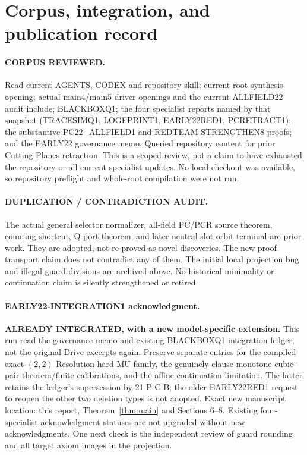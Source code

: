 \documentclass[11pt]{article}
\begin{document}
\section{Corpus, integration, and publication record}
\paragraph{CORPUS REVIEWED.}
Read current AGENTS, CODEX and repository skill; current root synthesis
opening; actual main4/main5 driver openings and the current ALLFIELD22 audit
include; BLACKBOXQ1; the four specialist reports named by that snapshot
(TRACESIMQ1, LOGFPRINT1, EARLY22RED1, PCRETRACT1); the substantive
PC22\_ALLFIELD1 and REDTEAM-STRENGTHEN8 proofs; and the EARLY22 governance
memo. Queried repository content for prior Cutting Planes retraction. This
is a scoped review, not a claim to have exhausted the repository or all
current specialist updates. No local checkout was available, so repository
preflight and whole-root compilation were not run.

\paragraph{DUPLICATION / CONTRADICTION AUDIT.}
The actual general selector normalizer, all-field PC/PCR source theorem,
counting shortcut, Q port theorem, and later neutral-slot orbit terminal are
prior work. They are adopted, not re-proved as novel discoveries. The new
proof-transport claim does not contradict any of them. The initial local
projection bug and illegal guard divisions are archived above. No historical
minimality or continuation claim is silently strengthened or retired.

\paragraph{EARLY22-INTEGRATION1 acknowledgment.}
\textbf{ALREADY INTEGRATED, with a new model-specific extension.} This run
read the governance memo and existing BLACKBOXQ1 integration ledger, not the
original Drive excerpts again. Preserve separate entries for the compiled
exact-$(2,2)$ Resolution-hard MU family, the genuinely clause-monotone
cubic-pair theorem/finite calibrations, and the affine-continuation
limitation. The latter retains the ledger's supersession by 21 P C B; the
older EARLY22RED1 request to reopen the other two deletion types is not
adopted. Exact new manuscript location: this report, Theorem~\ref{thm:main}
and Sections 6--8. Existing four-specialist acknowledgment statuses are not
upgraded without new acknowledgments. One next check is the independent
review of guard rounding and all target axiom images in the projection.
\end{document}
